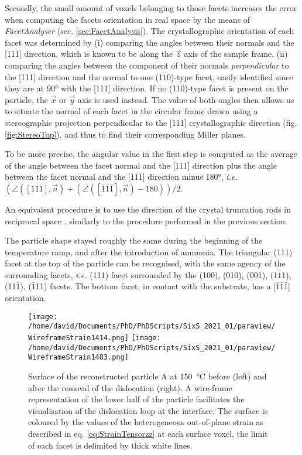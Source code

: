 Secondly, the small amount of voxels belonging to those facets increases the error when computing the facets orientation in real space by the means of \textit{FacetAnalyser} (sec. \ref{sec:FacetAnalysis}).
The crystallographic orientation of each facet was determined by (i) comparing the angles between their normals and the [111] direction, which is known to be along the $\vec{z}$ axis of the sample frame.
(ii) comparing the angles between the component of their normals \textit{perpendicular} to the [111] direction and the normal to one (1$\bar{1}$0)-type facet, easily identified since they are at \ang{90} with the [111] direction.
If no (1$\bar{1}$0)-type facet is present on the particle, the $\vec{x}$ or $\vec{y}$ axis is used instead.
The value of both angles then allows us to situate the normal of each facet in the circular frame drawn using a stereographic projection perpendicular to the [111] crystallographic direction (fig. \ref{fig:StereoTop}), and thus to find their corresponding Miller planes.

To be more precise, the angular value in the first step is computed as the average of the angle between the facet normal and the [111] direction plus the angle between the facet normal and the [$\bar{1}\bar{1}\bar{1}$] direction minus \ang{180}, \textit{i.e.} $(\angle ([111], \vec{n}) + (\angle ([\bar{1}\bar{1}\bar{1}], \vec{n}) -180))/2$.

An equivalent procedure is to use the direction of the crystal truncation rods in reciprocal space \parencite{Richard2018}, similarly to the procedure performed in the previous section.

The particle shape stayed roughly the same during the beginning of the temperature ramp, and after the introduction of ammonia.
The triangular (111) facet at the top of the particle can be recognised, with the same agency of the surrounding facets, \textit{i.e.} (111) facet surrounded by the (100), (010), (001), (1$\bar{1}$1), (11$\bar{1}$), ($\bar{1}$11) facets.
The bottom facet, in contact with the substrate, has a [$\bar{1}\bar{1}\bar{1}$] orientation.

\begin{figure}[!htb]
    \centering
    \texttt{[image: /home/david/Documents/PhD/PhDScripts/SixS\_2021\_01/paraview/WireframeStrain1414.png]}
    \texttt{[image: /home/david/Documents/PhD/PhDScripts/SixS\_2021\_01/paraview/WireframeStrain1483.png]}
    \caption{
        Surface of the reconstructed particle A at \qty{150}{\degreeCelsius} before (left) and after the removal of the dislocation (right).
        A wire-frame representation of the lower half of the particle facilitates the visualisation of the dislocation loop at the interface.
        The surface is coloured by the values of the heterogeneous out-of-plane strain as described in eq. \ref{eq:StrainTensorzz} at each surface voxel, the limit of each facet is delimited by thick white lines.
    }
    \label{fig:AmaterasuDislocation}
\end{figure}


